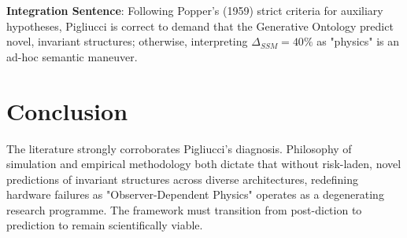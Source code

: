 \documentclass{article}
\begin{document}
\textbf{Integration Sentence}: Following Popper's (1959) strict criteria for auxiliary hypotheses, Pigliucci is correct to demand that the Generative Ontology predict novel, invariant structures; otherwise, interpreting $\Delta_{SSM} = 40\%$ as "physics" is an ad-hoc semantic maneuver.

\section{Conclusion}
The literature strongly corroborates Pigliucci's diagnosis. Philosophy of simulation and empirical methodology both dictate that without risk-laden, novel predictions of invariant structures across diverse architectures, redefining hardware failures as "Observer-Dependent Physics" operates as a degenerating research programme. The framework must transition from post-diction to prediction to remain scientifically viable.
\end{document}

